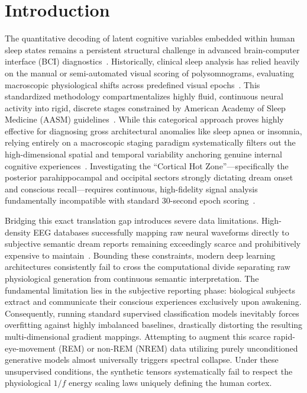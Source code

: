 \documentclass[journal]{IEEEtran}
\begin{document}
\section{Introduction}

The quantitative decoding of latent cognitive variables embedded within human sleep states remains a persistent structural challenge in advanced brain-computer interface (BCI) diagnostics~\cite{tarailis2024functional}. Historically, clinical sleep analysis has relied heavily on the manual or semi-automated visual scoring of polysomnograms, evaluating macroscopic physiological shifts across predefined visual epochs~\cite{amrita2022eeg}. This standardized methodology compartmentalizes highly fluid, continuous neural activity into rigid, discrete stages constrained by American Academy of Sleep Medicine (AASM) guidelines~\cite{anitha2024efficient}. While this categorical approach proves highly effective for diagnosing gross architectural anomalies like sleep apnea or insomnia, relying entirely on a macroscopic staging paradigm systematically filters out the high-dimensional spatial and temporal variability anchoring genuine internal cognitive experiences~\cite{10.3389/fnhum.2019.00348}. Investigating the ``Cortical Hot Zone''---specifically the posterior parahippocampal and occipital sectors strongly dictating dream onset and conscious recall---requires continuous, high-fidelity signal analysis fundamentally incompatible with standard 30-second epoch scoring~\cite{siclari2018dreaming}.

Bridging this exact translation gap introduces severe data limitations. High-density EEG databases successfully mapping raw neural waveforms directly to subjective semantic dream reports remaining exceedingly scarce and prohibitively expensive to maintain~\cite{diezig2024eeg, hartmann2018eeggan}. Bounding these constraints, modern deep learning architectures consistently fail to cross the computational divide separating raw physiological generation from continuous semantic interpretation. The fundamental limitation lies in the subjective reporting phase: biological subjects extract and communicate their conscious experiences exclusively upon awakening. Consequently, running standard supervised classification models inevitably forces overfitting against highly imbalanced baselines, drastically distorting the resulting multi-dimensional gradient mappings. Attempting to augment this scarce rapid-eye-movement (REM) or non-REM (NREM) data utilizing purely unconditioned generative models almost universally triggers spectral collapse. Under these unsupervised conditions, the synthetic tensors systematically fail to respect the physiological $1/f$ energy scaling laws uniquely defining the human cortex.
\end{document}

